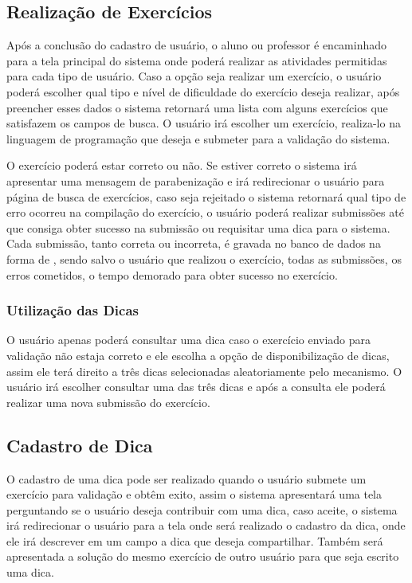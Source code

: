 

\subsection{Realização de Exercícios}

Após a conclusão do cadastro de usuário, o aluno ou professor é encaminhado para a tela principal do sistema onde poderá realizar as atividades permitidas para cada tipo de usuário. Caso a opção seja realizar um exercício, o usuário poderá escolher qual tipo e nível de dificuldade do exercício deseja realizar, após preencher esses dados o sistema retornará uma lista com alguns exercícios que satisfazem os campos de busca. O usuário irá escolher um exercício, realiza-lo na linguagem de programação que deseja e submeter para a validação do sistema. 

O exercício poderá estar correto ou não. Se estiver correto o sistema irá apresentar uma mensagem de parabenização e irá redirecionar o usuário para página de busca de exercícios, caso seja rejeitado o sistema retornará qual tipo de erro ocorreu na compilação do exercício, o usuário poderá realizar submissões até que consiga obter sucesso na submissão ou requisitar uma dica para o sistema. Cada submissão, tanto correta ou incorreta, é gravada no banco de dados na forma de , sendo salvo o usuário que realizou o exercício, todas as submissões, os erros cometidos, o tempo demorado para obter sucesso no exercício.

\subsubsection{Utilização das Dicas}

O usuário apenas poderá consultar uma dica caso o exercício enviado para validação não estaja correto e ele escolha a opção de disponibilização de dicas, assim ele terá direito a três dicas selecionadas aleatoriamente pelo mecanismo. O usuário irá escolher consultar uma das três dicas e após a consulta ele poderá realizar uma nova submissão do exercício.

\subsection{Cadastro de Dica}

O cadastro de uma dica pode ser realizado quando o usuário submete um exercício para validação e obtêm exito, assim o sistema apresentará uma tela perguntando se o usuário deseja contribuir com uma dica, caso aceite, o sistema irá redirecionar o usuário para a tela onde será realizado o cadastro da dica, onde ele irá descrever em um campo a dica que deseja compartilhar. Também será apresentada a solução do mesmo exercício de outro usuário para que seja escrito uma dica. 


